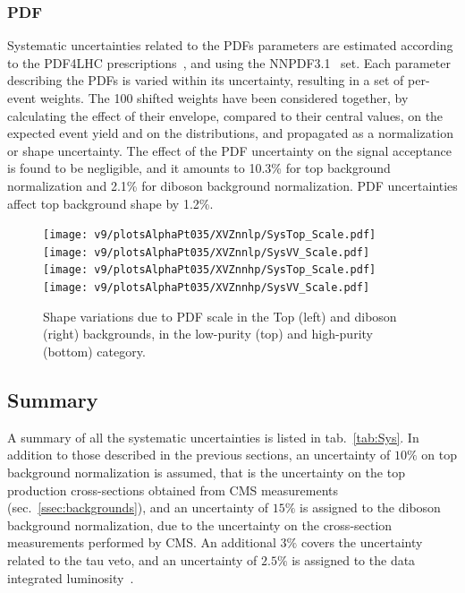 \subsubsection{PDF}

Systematic uncertainties related to the PDFs parameters are estimated according to the PDF4LHC prescriptions~\cite{Butterworth:2015oua}, and using the NNPDF3.1~\cite{Ball:2017nwa} set. Each parameter describing the PDFs is varied within its uncertainty, resulting in a set of per-event weights. The 100 shifted weights have been considered together, by calculating the effect of their envelope, compared to their central values, on the expected event yield and on the \mtVZ distributions, and propagated as a normalization or shape uncertainty. The effect of the PDF uncertainty on the signal acceptance is found to be negligible, and it amounts to 10.3\% for top background normalization and 2.1\% for diboson background normalization. PDF uncertainties affect top background shape by 1.2\%.

 \begin{figure}[!htb]
   \begin{center}
     \texttt{[image: v9/plotsAlphaPt035/XVZnnlp/SysTop\_Scale.pdf]}
     \texttt{[image: v9/plotsAlphaPt035/XVZnnlp/SysVV\_Scale.pdf]}
     \\
     \texttt{[image: v9/plotsAlphaPt035/XVZnnhp/SysTop\_Scale.pdf]}
     \texttt{[image: v9/plotsAlphaPt035/XVZnnhp/SysVV\_Scale.pdf]}

   \end{center}
   \caption{Shape variations due to PDF scale in the Top (left) and diboson (right) backgrounds, in the low-purity (top) and high-purity (bottom) category.}
   \label{fig:sysPDF}
 \end{figure}


\subsection{Summary}

A summary of all the systematic uncertainties is listed in tab.~\ref{tab:Sys}. In addition to those described in the previous sections, an uncertainty of $10\%$ on top background normalization is assumed, that is the uncertainty on the top production cross-sections obtained from CMS measurements (sec.~\ref{ssec:backgrounds}), and an uncertainty of $15\%$ is assigned to the diboson background normalization, due to the uncertainty on the cross-section measurements performed by CMS. An additional $3\%$ covers the uncertainty related to the tau veto, and an uncertainty of $2.5\%$ is assigned to the data integrated luminosity~\cite{CMS:2017sdi}.

